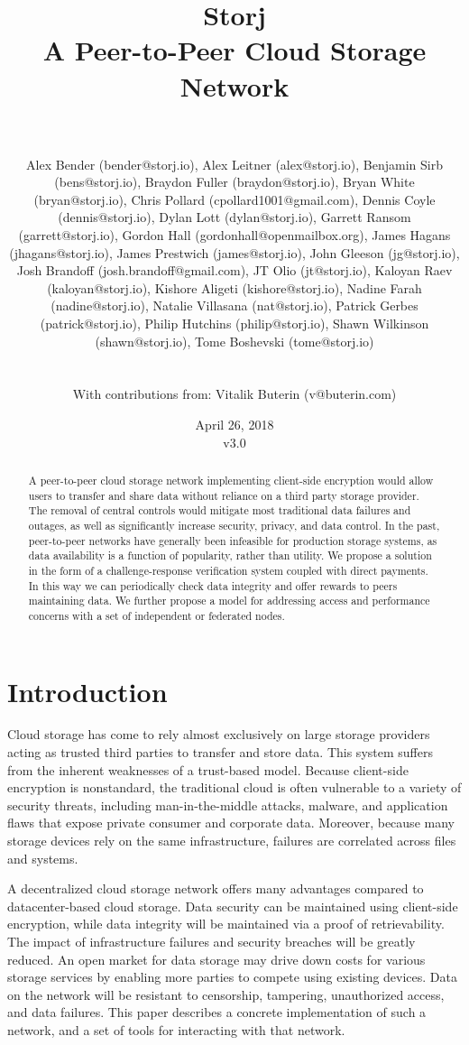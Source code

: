 \documentclass[a4paper,10pt]{article}
\title{\textbf{Storj\\A Peer-to-Peer Cloud Storage Network}}
\author{\\
\parbox{\linewidth}{\centering\small
Alex Bender (bender@storj.io),
Alex Leitner (alex@storj.io),
Benjamin Sirb (bens@storj.io),
Braydon Fuller (braydon@storj.io),
Bryan White (bryan@storj.io),
Chris Pollard (cpollard1001@gmail.com),
Dennis Coyle (dennis@storj.io),
Dylan Lott (dylan@storj.io),
Garrett Ransom (garrett@storj.io),
Gordon Hall (gordonhall@openmailbox.org),
James Hagans (jhagans@storj.io),
James Prestwich (james@storj.io),
John Gleeson (jg@storj.io),
Josh Brandoff (josh.brandoff@gmail.com),
JT Olio (jt@storj.io),
Kaloyan Raev (kaloyan@storj.io),
Kishore Aligeti (kishore@storj.io),
Nadine Farah (nadine@storj.io),
Natalie Villasana (nat@storj.io),
Patrick Gerbes (patrick@storj.io),
Philip Hutchins (philip@storj.io),
Shawn Wilkinson (shawn@storj.io),
Tome Boshevski (tome@storj.io)}\\
\\
\small With contributions from: Vitalik Buterin (v@buterin.com)
}
\date {April 26, 2018 \\ v3.0}
\begin{document}
\maketitle

\begin{abstract}
A peer-to-peer cloud storage network implementing client-side encryption would
allow users to transfer and share data without reliance on a third party storage
provider. The removal of central controls would mitigate most traditional data
failures and outages, as well as significantly increase security, privacy, and
data control. In the past, peer-to-peer networks have generally been infeasible
for production storage systems, as data availability is a function of
popularity, rather than utility. We propose a solution in the form of a
challenge-response verification system coupled with direct payments. In this
way we can periodically check data integrity and offer rewards to peers
maintaining data. We further propose a model for addressing access and
performance concerns with a set of independent or federated nodes.
\end{abstract}

\section{Introduction}

Cloud storage has come to rely almost exclusively on large storage providers
acting as trusted third parties to transfer and store data. This system suffers
from the inherent weaknesses of a trust-based model. Because client-side
encryption is nonstandard, the traditional cloud is often vulnerable to a
variety of security threats, including man-in-the-middle attacks, malware, and
application flaws that expose private consumer and corporate data. Moreover,
because many storage devices rely on the same infrastructure, failures are
correlated across files and systems.

A decentralized cloud storage network offers many advantages compared to
datacenter-based cloud storage. Data security can be maintained using
client-side encryption, while data integrity will be maintained via a proof of
retrievability. The impact of infrastructure failures and security breaches will
be greatly reduced. An open market for data storage may drive down costs for
various storage services by enabling more parties to compete using existing
devices. Data on the network will be resistant to censorship, tampering,
unauthorized access, and data failures. This paper describes a concrete
implementation of such a network, and a set of tools for interacting with that
network.
\end{document}
